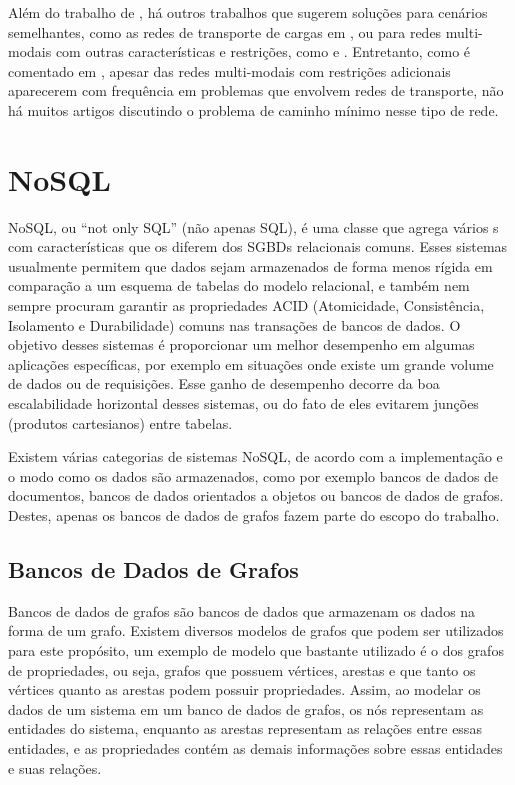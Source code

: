 Além do trabalho de \cite{kao2008}, há outros trabalhos que sugerem soluções para cenários semelhantes, como as redes de transporte de cargas em \cite{Ziliaskopoulos2000486}, ou para redes multi-modais com outras características e restrições, como \cite{Lozano2001225} e \cite{Lozano2002853}. Entretanto, como é comentado em \cite{Lozano2001225}, apesar das redes multi-modais com restrições adicionais aparecerem com frequência em problemas que envolvem redes de transporte, não há muitos artigos discutindo o problema de caminho mínimo nesse tipo de rede. 


\section{NoSQL}

NoSQL, ou ``not only SQL'' (não apenas SQL), é uma classe que agrega vários s com características que os diferem dos SGBDs relacionais comuns.
Esses sistemas usualmente permitem que dados sejam armazenados de forma menos rígida em comparação a um esquema de tabelas do modelo relacional, e também nem sempre procuram garantir as propriedades ACID (Atomicidade, Consistência, Isolamento e Durabilidade) comuns nas transações de bancos de dados.
O objetivo desses sistemas é proporcionar um melhor desempenho em algumas aplicações específicas, por exemplo em situações onde existe um grande volume de dados ou de requisições. Esse ganho de desempenho decorre da boa escalabilidade horizontal desses sistemas, ou do fato de eles evitarem junções (produtos cartesianos) entre tabelas.

Existem várias categorias de sistemas NoSQL, de acordo com a implementação e o modo como os dados são armazenados, como por exemplo bancos de dados de documentos, bancos de dados orientados a objetos ou bancos de dados de grafos.
Destes, apenas os bancos de dados de grafos fazem parte do escopo do trabalho.

\subsection{Bancos de Dados de Grafos}


Bancos de dados de grafos são bancos de dados que armazenam os dados na forma de um grafo. Existem diversos modelos de grafos que podem ser utilizados para este propósito, um exemplo de modelo que bastante utilizado é o dos grafos de propriedades, ou seja, grafos que possuem vértices, arestas e que tanto os vértices quanto as arestas podem possuir propriedades.
Assim, ao modelar os dados de um sistema em um banco de dados de grafos, os nós representam as entidades do sistema, enquanto as arestas representam as relações entre essas entidades, e as propriedades contém as demais informações sobre essas entidades e suas relações.

